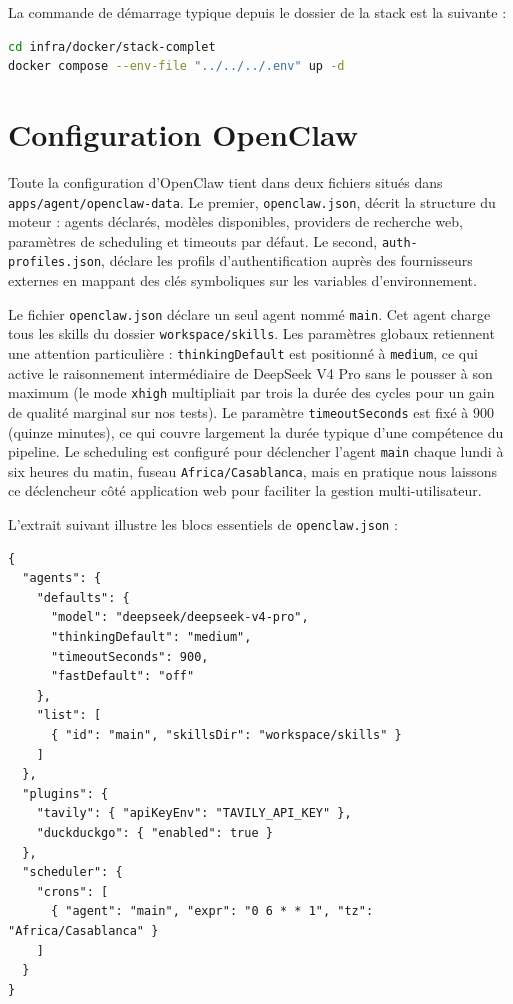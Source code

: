 \documentclass[12pt,a4paper,openany]{report}
\begin{document}
La commande de démarrage typique depuis le dossier de la stack est la suivante :

\begin{lstlisting}[language=bash,caption={Commande de demarrage de la stack de developpement}]
cd infra/docker/stack-complet
docker compose --env-file "../../../.env" up -d
\end{lstlisting}


\section{Configuration OpenClaw}
\label{sec:config-openclaw}

Toute la configuration d'OpenClaw tient dans deux fichiers situés dans \texttt{apps/agent/openclaw-data}. Le premier, \texttt{openclaw.json}, décrit la structure du moteur : agents déclarés, modèles disponibles, providers de recherche web, paramètres de scheduling et timeouts par défaut. Le second, \texttt{auth-profiles.json}, déclare les profils d'authentification auprès des fournisseurs externes en mappant des clés symboliques sur les variables d'environnement.

Le fichier \texttt{openclaw.json} déclare un seul agent nommé \texttt{main}. Cet agent charge tous les skills du dossier \texttt{workspace/skills}. Les paramètres globaux retiennent une attention particulière : \texttt{thinkingDefault} est positionné à \texttt{medium}, ce qui active le raisonnement intermédiaire de DeepSeek V4 Pro sans le pousser à son maximum (le mode \texttt{xhigh} multipliait par trois la durée des cycles pour un gain de qualité marginal sur nos tests). Le paramètre \texttt{timeoutSeconds} est fixé à 900 (quinze minutes), ce qui couvre largement la durée typique d'une compétence du pipeline. Le scheduling est configuré pour déclencher l'agent \texttt{main} chaque lundi à six heures du matin, fuseau \texttt{Africa/Casablanca}, mais en pratique nous laissons ce déclencheur côté application web pour faciliter la gestion multi-utilisateur.

L'extrait suivant illustre les blocs essentiels de \texttt{openclaw.json} :

\begin{lstlisting}[language={},caption={Extrait significatif de openclaw.json}]
{
  "agents": {
    "defaults": {
      "model": "deepseek/deepseek-v4-pro",
      "thinkingDefault": "medium",
      "timeoutSeconds": 900,
      "fastDefault": "off"
    },
    "list": [
      { "id": "main", "skillsDir": "workspace/skills" }
    ]
  },
  "plugins": {
    "tavily": { "apiKeyEnv": "TAVILY_API_KEY" },
    "duckduckgo": { "enabled": true }
  },
  "scheduler": {
    "crons": [
      { "agent": "main", "expr": "0 6 * * 1", "tz": "Africa/Casablanca" }
    ]
  }
}
\end{lstlisting}
\end{document}
